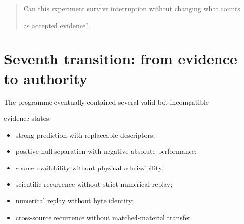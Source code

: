 \documentclass[11pt,a4paper,oneside]{report}
\begin{document}
\begin{quote}



Can this experiment survive interruption without changing what counts

as accepted evidence?



\end{quote}





\section{Seventh transition: from evidence to authority}



The programme eventually contained several valid but incompatible

evidence states:



\begin{itemize}



\item

strong prediction with replaceable descriptors;



\item

positive null separation with negative absolute performance;



\item

source availability without physical admissibility;



\item

scientific recurrence without strict numerical replay;



\item

numerical replay without byte identity;



\item

cross-source recurrence without matched-material transfer.



\end{itemize}
\end{document}
